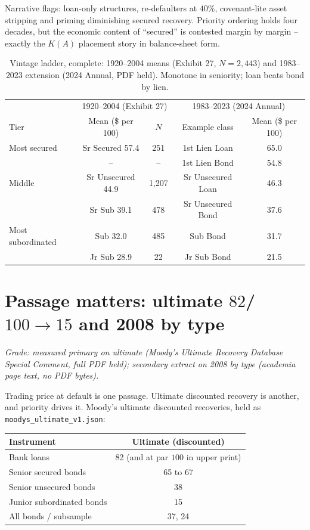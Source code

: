 Narrative flags: loan-only structures, re-defaulters at $40\%$, covenant-lite asset stripping and priming diminishing secured recovery. Priority ordering holds four decades, but the economic content of ``secured'' is contested margin by margin -- exactly the $K(A)$ placement story in balance-sheet form.

\begin{table}[h]
\centering
\small
\caption{Vintage ladder, complete: 1920--2004 means (Exhibit 27, $N=2{,}443$) and 1983--2023 extension (2024 Annual, PDF held). Monotone in seniority; loan beats bond by lien.}
\label{tab:vintage-complete}
\begin{tabular}{lcccc}
\toprule
 & \multicolumn{2}{c}{1920--2004 (Exhibit 27)} & \multicolumn{2}{c}{1983--2023 (2024 Annual)} \\
Tier & Mean (\$ per 100) & $N$ & Example class & Mean (\$ per 100) \\
\midrule
Most secured & Sr Secured 57.4 & 251 & 1st Lien Loan & 65.0 \\
 & -- & -- & 1st Lien Bond & 54.8 \\
Middle & Sr Unsecured 44.9 & 1,207 & Sr Unsecured Loan & 46.3 \\
 & Sr Sub 39.1 & 478 & Sr Unsecured Bond & 37.6 \\
Most subordinated & Sub 32.0 & 485 & Sub Bond & 31.7 \\
 & Jr Sub 28.9 & 22 & Jr Sub Bond & 21.5 \\
\bottomrule
\end{tabular}
\end{table}

\section{Passage matters: ultimate $82$/$100\to 15$ and 2008 by type}
\label{sec:ultimate-passage}

\textit{Grade: measured primary on ultimate (Moody's Ultimate Recovery Database Special Comment, full PDF held); secondary extract on 2008 by type (academia page text, no PDF bytes).}

Trading price at default is one passage. Ultimate discounted recovery is another, and priority drives it. Moody's ultimate discounted recoveries, held as \texttt{moodys\_ultimate\_v1.json}:

\begin{center}
\small
\begin{tabular}{lc}
\toprule
Instrument & Ultimate (discounted) \\
\midrule
Bank loans & 82 (and at par $100$ in upper print) \\
Senior secured bonds & 65 to 67 \\
Senior unsecured bonds & 38 \\
Junior subordinated bonds & 15 \\
All bonds / subsample & 37, 24 \\
\bottomrule
\end{tabular}
\end{center}

